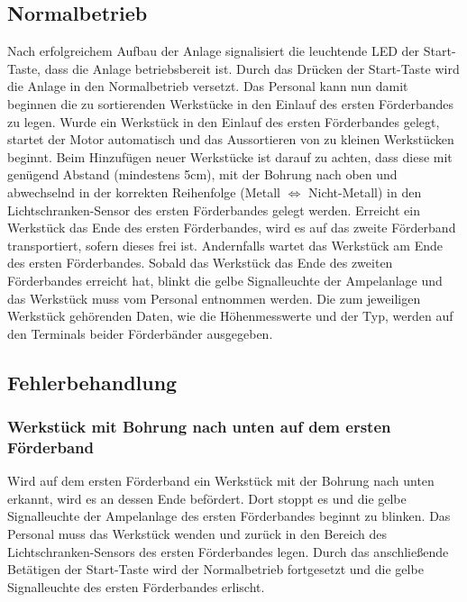 \documentclass[oneside,a4paper,titlepage]{scrartcl} %
\begin{document}
\subsection{Normalbetrieb}
Nach erfolgreichem Aufbau der Anlage signalisiert die leuchtende LED der Start-Taste, dass die Anlage betriebsbereit ist. Durch das Drücken der Start-Taste wird die Anlage in den Normalbetrieb versetzt.
\newline
Das Personal kann nun damit beginnen die zu sortierenden Werkstücke in den Einlauf des ersten Förderbandes zu legen.\newline
\newline
Wurde ein Werkstück in den Einlauf des ersten Förderbandes gelegt, startet der Motor automatisch und das Aussortieren von zu kleinen Werkstücken beginnt.\newline
Beim Hinzufügen neuer Werkstücke ist darauf zu achten, dass diese mit genügend Abstand (mindestens 5cm), mit der Bohrung nach oben und abwechselnd in der korrekten Reihenfolge (Metall $\Leftrightarrow$ Nicht-Metall) in den Lichtschranken-Sensor des ersten Förderbandes gelegt werden.\newline
\newline
Erreicht ein Werkstück das Ende des ersten Förderbandes, wird es auf das zweite Förderband transportiert, sofern dieses frei ist. Andernfalls wartet das Werkstück am Ende des ersten Förderbandes.\newline
\newline
Sobald das Werkstück das Ende des zweiten Förderbandes erreicht hat, blinkt die gelbe Signalleuchte der Ampelanlage und das Werkstück muss vom Personal entnommen werden.\newline
\newline
Die zum jeweiligen Werkstück gehörenden Daten, wie die Höhenmesswerte und der Typ, werden auf den Terminals beider Förderbänder ausgegeben.

\newpage

\subsection{Fehlerbehandlung}
\subsubsection{Werkstück mit Bohrung nach unten auf dem ersten Förderband}
Wird auf dem ersten Förderband ein Werkstück mit der Bohrung nach unten erkannt, wird es an dessen Ende befördert. Dort stoppt es und die gelbe Signalleuchte der Ampelanlage des ersten Förderbandes beginnt zu blinken. Das Personal muss das Werkstück wenden und zurück in den Bereich des Lichtschranken-Sensors des ersten Förderbandes legen. Durch das anschließende Betätigen der Start-Taste wird der Normalbetrieb fortgesetzt und die gelbe Signalleuchte des ersten Förderbandes erlischt.
\end{document}
